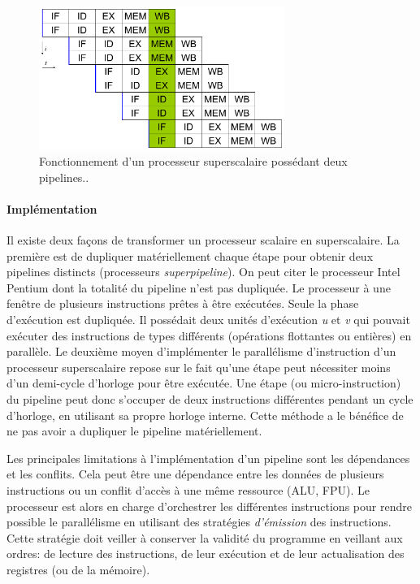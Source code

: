\begin{figure}
    \center
    \includegraphics[width=8cm]{images/Chapitre1/superscalar.png}
    \caption[Processeur superscalaire]{Fonctionnement d'un processeur superscalaire possédant deux pipelines.\protect\footnotemark. \label{pic_superscalar} }
\end{figure}

\paragraph{Implémentation}
Il existe deux façons de transformer un processeur scalaire en superscalaire. La première est de dupliquer matériellement chaque étape pour obtenir deux pipelines distincts (processeurs \textit{superpipeline}). On peut citer le processeur Intel Pentium dont la totalité du pipeline n'est pas dupliquée. Le processeur à une fenêtre de plusieurs instructions prêtes à être exécutées. Seule la phase d'exécution est dupliquée.  Il possédait deux unités d'exécution \textit{u} et \textit{v} qui pouvait exécuter des instructions de types différents (opérations flottantes ou entières) en parallèle. 
Le deuxième moyen d'implémenter le parallélisme d'instruction d'un processeur superscalaire repose sur le fait qu'une étape peut nécessiter moins d'un demi-cycle d'horloge pour être exécutée. Une étape (ou micro-instruction) du pipeline peut donc s'occuper de deux instructions différentes pendant un cycle d'horloge, en utilisant sa propre horloge interne. Cette méthode a le bénéfice de ne pas avoir a dupliquer le pipeline matériellement. 

Les principales limitations à l'implémentation d'un pipeline sont les dépendances et les conflits. Cela peut être une dépendance entre les données de plusieurs instructions ou un conflit d'accès à une même ressource (ALU, FPU). Le processeur est alors en charge d'orchestrer les différentes instructions pour rendre possible le parallélisme en utilisant des stratégies \textit{d’émission} \cite{johnson1989super} des instructions. Cette stratégie doit veiller à conserver la validité du programme en veillant aux ordres: de lecture des instructions, de leur exécution et de leur actualisation des registres (ou de la mémoire). 


